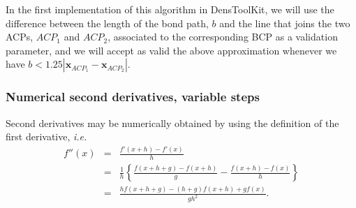 \documentclass[11pt]{amsart}
\newcommand{\vecx}{\boldsymbol{x}}
\begin{document}
In the first implementation of this algorithm in DensToolKit, we will use the difference between
the length of the bond path, $b$  and the line that joins the two ACPs, $ACP_1$ and $ACP_2$, associated to the corresponding BCP as a validation parameter, and we will accept as valid the above approximation whenever we have
$b<1.25|\vecx_{ACP_1}-\vecx_{ACP_2}|$.

\subsubsection{Numerical second derivatives, variable steps}

Second derivatives may be numerically obtained by using the definition of the
first derivative, \textit{i.e.}
%
\begin{eqnarray}%
  f''(x) & = &\frac{f'(x+h)-f'(x)}{h}\nonumber\\
  & = &\frac{1}{h}\left\{ \frac{f(x+h+g)-f(x+h)}{g}-\frac{f(x+h)-f(x)}{h} \right\}\nonumber\\
  & = & \frac{hf(x+h+g)-(h+g)f(x+h)+gf(x)}{gh^2}.
\end{eqnarray}
%
\end{document}
